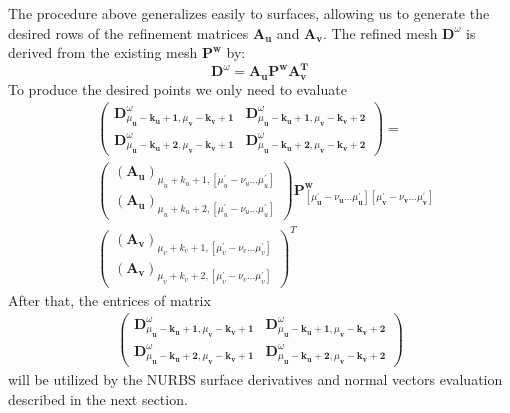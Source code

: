 \documentclass[acmtog]{acmart}
\begin{document}
The procedure above generalizes easily to surfaces, allowing us to generate the desired rows of the refinement matrices $\mathbf{A}_{\mathbf{u}}$ and $\mathbf{A}_{\mathbf{v}}$. The refined mesh $\mathbf{D}^\omega$ is derived from the existing mesh $\mathbf{P}^{\mathbf{w}}$ by:
$$
\mathbf{D}^\omega=\mathbf{A}_{\mathbf{u}} \mathbf{P}^{\mathbf{w}} \mathbf{A}_{\mathbf{v}}^{\mathbf{T}}
$$
To produce the desired points we only need to evaluate
$$
\begin{aligned}
& \left(\begin{array}{ll}
\mathbf{D}_{\mu_{\mathbf{u}}-\mathbf{k}_{\mathbf{u}}+\mathbf{1}, \mu_{\mathbf{v}}-\mathbf{k}_{\mathbf{v}}+\mathbf{1}}^\omega & \mathbf{D}_{\mu_{\mathbf{u}}-\mathbf{k}_{\mathbf{u}}+\mathbf{1}, \mu_{\mathbf{v}}-\mathbf{k}_{\mathbf{v}}+\mathbf{2}}^\omega \\
\mathbf{D}_{\mu_{\mathbf{u}}-\mathbf{k}_{\mathbf{u}}+\mathbf{2}, \mu_{\mathbf{v}}-\mathbf{k}_{\mathbf{v}}+\mathbf{1}}^\omega & \mathbf{D}_{\mu_{\mathbf{u}}-\mathbf{k}_{\mathbf{u}}+\mathbf{2}, \mu_{\mathbf{v}}-\mathbf{k}_{\mathbf{v}}+\mathbf{2}}^\omega
\end{array}\right)= \\
& \left(\begin{array}{l}
\left(\mathbf{A}_{\mathbf{u}}\right)_{\mu_u+k_u+1,\left[\mu_u^{\prime}-\nu_u \ldots \mu_u^{\prime}\right]} \\
\left(\mathbf{A}_{\mathbf{u}}\right)_{\mu_u+k_u+2,\left[\mu_u^{\prime}-\nu_u \ldots \mu_u^{\prime}\right]}
\end{array}\right) \mathbf{P}_{\left[\mu_{\mathbf{u}}^{\prime}-\nu_{\mathbf{u}} \ldots \mu_{\mathbf{u}}^{\prime}\right]\left[\mu_{\mathbf{v}}^{\prime}-\nu_{\mathbf{v}} \ldots \mu_{\mathbf{v}}^{\prime}\right]}^{\mathbf{w}}\\
&\left(\begin{array}{c}
\left(\mathbf{A}_{\mathbf{v}}\right)_{\mu_v+k_v+1,\left[\mu_v^{\prime}-\nu_v \ldots \mu_v^{\prime}\right]} \\
\left(\mathbf{A}_{\mathbf{v}}\right)_{\mu_v+k_v+2,\left[\mu_v^{\prime}-\nu_v \ldots \mu_v^{\prime}\right]}
\end{array}\right)^T
\end{aligned}
$$
After that, the entrices of matrix
\[
\begin{aligned}
    \left(\begin{array}{ll}
        \mathbf{D}_{\mu_{\mathbf{u}}-\mathbf{k}_{\mathbf{u}}+\mathbf{1}, \mu_{\mathbf{v}}-\mathbf{k}_{\mathbf{v}}+\mathbf{1}}^\omega & \mathbf{D}_{\mu_{\mathbf{u}}-\mathbf{k}_{\mathbf{u}}+\mathbf{1}, \mu_{\mathbf{v}}-\mathbf{k}_{\mathbf{v}}+\mathbf{2}}^\omega \\
        \mathbf{D}_{\mu_{\mathbf{u}}-\mathbf{k}_{\mathbf{u}}+\mathbf{2}, \mu_{\mathbf{v}}-\mathbf{k}_{\mathbf{v}}+\mathbf{1}}^\omega & \mathbf{D}_{\mu_{\mathbf{u}}-\mathbf{k}_{\mathbf{u}}+\mathbf{2}, \mu_{\mathbf{v}}-\mathbf{k}_{\mathbf{v}}+\mathbf{2}}^\omega
    \end{array}\right)
\end{aligned}
\]
will be utilized by the NURBS surface derivatives and normal vectors evaluation described in the next section.
\end{document}
